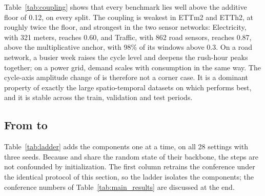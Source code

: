 {Table~\ref{tab:coupling} shows that every benchmark lies well above the additive floor of 0.12, on every split. The coupling is weakest in ETTm2 and ETTh2, at roughly twice the floor, and strongest in the two sensor networks: Electricity, with 321 meters, reaches 0.60, and Traffic, with 862 road sensors, reaches 0.87, above the multiplicative anchor, with 98\% of its windows above 0.3. On a road network, a busier week raises the cycle level and deepens the rush-hour peaks together; on a power grid, demand scales with consumption in the same way. The cycle-axis amplitude change of  is therefore not a corner case. It is a dominant property of exactly the large spatio-temporal datasets on which \sysname performs best, and it is stable across the train, validation and test periods.

\subsection{From \sysname to \sysLA}
\label{sec:exp_ladder}

Table~\ref{tab:ladder} adds the components one at a time, on all 28 settings with three seeds. Because \sysL and \sysLA share the random state of their \sysname backbone, the steps are not confounded by initialization. The first column retrains the conference \sysname under the identical protocol of this section, so the ladder isolates the components; the conference numbers of Table~\ref{tab:main_results} are discussed at the end.

}
